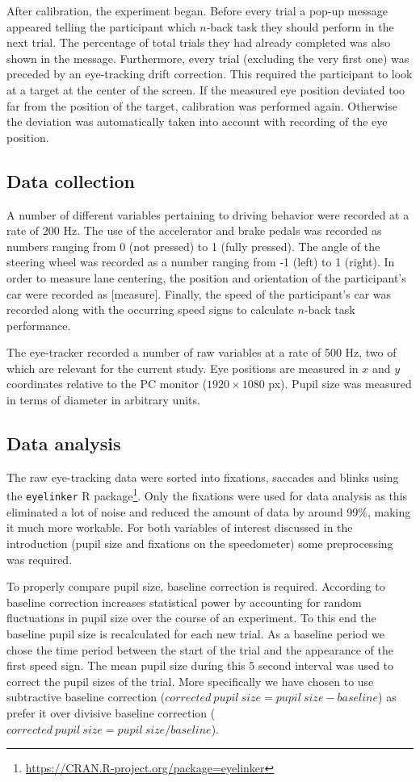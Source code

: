 After calibration, the experiment began. 
Before every trial a pop-up message appeared telling the participant which \(n\)-back task they should perform in the next trial. 
The percentage of total trials they had already completed was also shown in the message. 
Furthermore, every trial (excluding the very first one) was preceded by an eye-tracking drift correction. 
This required the participant to look at a target at the center of the screen. 
If the measured eye position deviated too far from the position of the target, calibration was performed again. 
Otherwise the deviation was automatically taken into account with recording of the eye position. 

\subsection{Data collection}
A number of different variables pertaining to driving behavior were recorded at a rate of 200 Hz. 
The use of the accelerator and brake pedals was recorded as numbers ranging from 0 (not pressed) to 1 (fully pressed). 
The angle of the steering wheel was recorded as a number ranging from -1 (left) to 1 (right).
In order to measure lane centering, the position and orientation of the participant's car were recorded as [measure]. 
Finally, the speed of the participant's car was recorded along with the occurring speed signs to calculate \(n\)-back task performance. 

The eye-tracker recorded a number of raw variables at a rate of 500 Hz, two of which are relevant for the current study.
Eye positions are measured in \(x\) and \(y\) coordinates relative to the PC monitor (\(1920 \times 1080\) px).
Pupil size was measured in terms of diameter in arbitrary units. 

\subsection{Data analysis}
The raw eye-tracking data were sorted into fixations, saccades and blinks using the \texttt{eyelinker} R package\footnote{\url{https://CRAN.R-project.org/package=eyelinker}}.
Only the fixations were used for data analysis as this eliminated a lot of noise and reduced the amount of data by around 99\%, making it much more workable.
For both variables of interest discussed in the introduction (pupil size and fixations on the speedometer) some preprocessing was required.

To properly compare pupil size, baseline correction is required. 
According to \citet{Mathot2018} baseline correction increases statistical power by accounting for random fluctuations in pupil size over the course of an experiment.
To this end the baseline pupil size is recalculated for each new trial.
As a baseline period we chose the time period between the start of the trial and the appearance of the first speed sign.
The mean pupil size during this 5 second interval was used to correct the pupil sizes of the trial.
More specifically we have chosen to use subtractive baseline correction (\(corrected\ pupil\ size = pupil\ size - baseline\)) 
as \citet{Mathot2018} prefer it over divisive baseline correction (\(corrected\ pupil\ size = pupil\ size / baseline\)).

